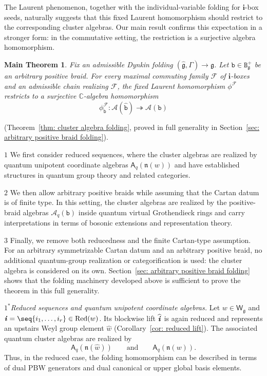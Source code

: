 \documentclass[12pt, leqno]{amsart}
\numberwithin{equation}{section}
\theoremstyle{plain}
\newtheorem*{thmx}{Main Theorem}
\theoremstyle{definition}
\newcommand{\g}{\mathfrak{g}}
\newcommand{\n}{\mathfrak{n}}
\newcommand{\C}{\mathbb{C}}
\newcommand{\ii}{ \textbf{\textit{i}}}
\newcommand{\hg}{{\widehat{\g}}}
\newcommand{\hw}{\widehat{w}}
\newcommand{\hii}{{\widehat{\ii}}}
\newcommand{\sfA}{\mathsf{A}}
\newcommand{\sfW}{\mathsf{W}}
\newcommand{\bfi}{\mathbf{i}}
\newcommand{\calA}{\mathcal{A}}
\newcommand{\calF}{\mathcal{F}}
\newcommand{\scrA}{\mathscr{A}}
\newcommand{\ttB}{\mathtt{B}}
\newcommand{\ttb}{\mathtt{b}}
\newcommand{\httb}{\widehat{\ttb}}
\newcommand{\Red}{\mathrm{Red}}
\begin{document}
The Laurent phenomenon, together with the individual-variable folding
for $\bfi$-box seeds, naturally suggests that this fixed Laurent
homomorphism should restrict to the corresponding cluster algebras.
Our main result confirms this expectation in a stronger form: in the
commutative setting, the restriction is a surjective algebra
homomorphism.

\begin{thmx}
Fix an admissible Dynkin folding
$(\hg,\Gamma)\to\mathfrak g$.
Let $\ttb\in \ttB_{\g}^{+}$ be an arbitrary positive braid. 
For every maximal commuting family $\calF$ of
$\bfi$-boxes and an admissible chain realizing $\calF$, the fixed
Laurent homomorphism $\phi^\calF$ restricts to a surjective
$\C$-algebra homomorphism
\[
\phi^\calF_\ttb:
\calA(\httb)\twoheadrightarrow\calA(\ttb)
\]
\end{thmx}
\noindent
(Theorem~\ref{thm: cluster algebra folding}, proved in full
generality in Section~\ref{sec: arbitrary positive braid folding}).


\smallskip

\noindent
$\boxed{1}$ We first consider reduced sequences, where the cluster
algebras are realized by quantum unipotent coordinate algebras
$\sfA_q(\n(w))$ and have established structures in quantum group theory and related categories.

\smallskip

\noindent
$\boxed{2}$ We then allow arbitrary positive braids while assuming
that the Cartan datum is of finite type. In this setting, the cluster algebras are realized by the
positive-braid algebras $\scrA_q(\ttb)$ inside quantum virtual
Grothendieck rings and carry interpretations in terms of bosonic
extensions and representation theory.

\smallskip

\noindent
$\boxed{3}$ Finally, we remove both reducedness and the finite Cartan-type assumption.
For an arbitrary symmetrizable Cartan datum and an arbitrary positive
braid, no additional quantum-group realization or categorification is used: 
the cluster algebra is considered on its own. Section~\ref{sec: arbitrary positive braid folding} shows that
the folding machinery developed above is sufficient to prove the
theorem in this full generality.

\medskip
\noindent
\medskip
\noindent
$\boxed{1}^*$\emph{Reduced sequences and quantum unipotent coordinate
algebras.}
Let $w\in\sfW_\g$ and  $\ii=\seq{i_1,\ldots,i_r}\in\Red(w)$.  Its blockwise lift $\hii$ is{}
again reduced and represents an upstairs Weyl group element $\hw$
(Corollary~\ref{cor: reduced lift}).
The associated quantum cluster algebras are realized by
\[
\sfA_q(\n(\hw)) \qquad\text{and}\qquad \sfA_q(\n(w)).
\]
Thus, in the reduced case, the folding homomorphism can be described
in terms of dual PBW generators and dual canonical or upper global
basis elements{}.
\end{document}
